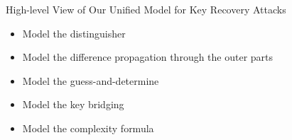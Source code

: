 \documentclass[table,aspectratio=169]{beamer}
\newcommand{\axu}{\texttt{AXU}\xspace} %
\newcommand{\dxu}{\texttt{DXU}\xspace} %
\newcommand{\axl}{\texttt{AXL}\xspace} %
\newcommand{\dxl}{\texttt{DXL}\xspace} %
\newcommand{\csp}{\textit{\texttt{CSP}}\xspace} %
\newcommand{\cptrue}{\textit{\texttt{True}}\xspace} %
\newcommand{\Up}{_{\textsc{u}}} %
\newcommand{\Low}{_{\textsc{l}}} %
\newcommand{\as}{m} %
\begin{document}

\begin{frame}{High-level View of Our Unified Model for Key Recovery Attacks}
\begin{itemize}
  \item Model the distinguisher
  \item Model the difference propagation through the outer parts
  \item Model the guess-and-determine
  \item Model the key bridging
  \item Model the complexity formula
\end{itemize}
\end{frame}
\end{document}
